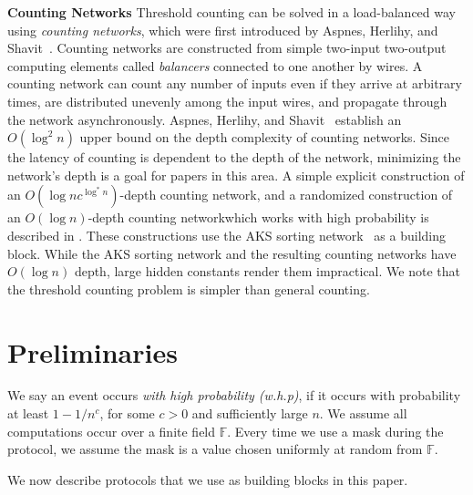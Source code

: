 \documentclass[10pt]{llncs}
\newcommand{\F}{\mathbb{F}}
\begin{document}
\smallskip
\noindent
{\bf Counting Networks} 
Threshold counting can be solved in a 
load-balanced way using
\emph{counting networks}, which were first introduced
by Aspnes, Herlihy, and Shavit~\cite{Aspnes:1991:CNM:103418.103421}.
Counting networks are
constructed from simple two-input two-output computing elements called
\emph{balancers} connected to one another by wires. A counting network
can count any number of inputs even if they arrive at arbitrary times,
are distributed unevenly among the input wires, and propagate through
the network asynchronously. Aspnes, Herlihy, and 
Shavit~\cite{Aspnes:1991:CNM:103418.103421} establish an $O(\log^2 n) $
upper bound on the depth complexity of counting networks.  Since the
latency of counting is dependent to the depth of the network,
minimizing the network's depth is a goal for papers in this area. A
simple explicit construction of an $O(\log{n} c^{ \log^*{n}})$-depth
counting network, and a randomized construction of an $O(\log n)
$-depth counting networkwhich works with high probability is described in
\cite{Klugerman:1992:SCN:129712.129752,Klugerman94small-depthcounting}. 
These constructions use the AKS sorting
network~\cite{Ajtai:1983:SN:800061.808726} as a building block.
While the AKS sorting network and the resulting counting networks
have $O(\log{n})$ depth, large hidden constants render them impractical.
We note that the threshold counting problem is simpler than general 
counting.


\section{Preliminaries}\label{s:pre}

We say an event occurs \emph{with high probability
  (w.h.p)}, if it occurs with probability at least $1-1/n^c$, for some
$c>0$ and sufficiently large $n$. We assume all computations occur
over a finite field $\F$. Every time we use a mask during the
protocol, we assume the mask is a value chosen uniformly at random
from $\F$.

We now describe protocols that we use as building
blocks in this paper.
\end{document}
